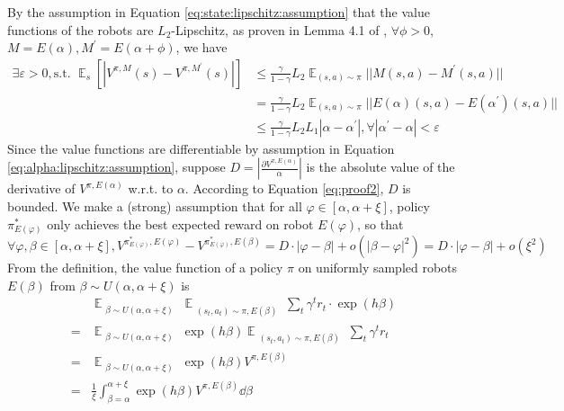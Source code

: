 By the assumption in Equation \eqref{eq:state:lipschitz:assumption} that the value functions of the robots are $L_2$-Lipschitz, as proven in Lemma 4.1 of \cite{slbo}, $\forall \phi > 0$, $M=E(\alpha), M^\prime=E(\alpha+\phi)$, we have 
\begin{equation}\label{eq:proof2}
\begin{split}
\exists \varepsilon > 0, \text{s.t. }
\mathop{\mathbb{E}}_{s} [ |V^{\pi,M}(s) - V^{\pi,M^\prime}(s)| ] 
& \le \frac{\gamma}{1-\gamma} L_2 \mathop{\mathbb{E}}_{(s,a)\sim \pi} || M(s,a) - M^\prime(s,a) || \\
& = \frac{\gamma}{1-\gamma} L_2 \mathop{\mathbb{E}}_{(s,a)\sim \pi} || E(\alpha)(s,a) - E(\alpha^\prime)(s,a) || \\
& \le \frac{\gamma}{1-\gamma} L_2 L_1 |\alpha - \alpha^\prime|, \forall |\alpha^\prime - \alpha | < \varepsilon 
\end{split}
\end{equation}
Since the value functions are differentiable by assumption in Equation \eqref{eq:alpha:lipschitz:assumption}, suppose $D = | \frac{\partial{V^{\pi,E(\alpha)}}}{\alpha} | $ is the absolute value of the derivative of $V^{\pi,E(\alpha)}$ w.r.t. to $\alpha$. 
According to Equation \eqref{eq:proof2}, $D$ is bounded.
We make a (strong) assumption that for all $\varphi\in [\alpha, \alpha+\xi]$, policy $\pi^*_{E(\varphi)}$ only achieves the best expected reward on robot $E(\varphi)$, so that
\begin{equation}
    \forall \varphi, \beta \in [\alpha, \alpha+\xi], 
    V^{\pi^*_{E(\varphi)},E(\varphi)} -
    V^{\pi^*_{E(\varphi)},E(\beta)} = D \cdot |\varphi - \beta| + o(|\beta-\varphi|^2)
    = D \cdot |\varphi - \beta| + o(\xi^2)
\end{equation}
From the definition, the value function of a policy $\pi$ on uniformly sampled robots $E(\beta)$ from $\beta\sim U(\alpha, \alpha+\xi)$ is
\begin{equation}
\begin{split}\label{eq:proof1}
    & \mathop{\mathbb{E}}_{ 
    \substack{
    \beta \sim U(\alpha, \alpha+\xi)
    }}
    \mathop{\mathbb{E}}_{ 
    \substack{(s_t, a_t) \sim \pi, E(\beta)
    }}
    \sum_{t} \gamma^t r_t \cdot\exp(h\beta) \\
    = & \mathop{\mathbb{E}}_{ 
    \substack{
    \beta \sim U(\alpha, \alpha+\xi)
    }}
    \exp(h\beta)
    \mathop{\mathbb{E}}_{ 
    \substack{(s_t, a_t) \sim \pi, E(\beta)
    }}
    \sum_{t} \gamma^t r_t  \\ 
    = & \mathop{\mathbb{E}}_{ 
    \substack{
    \beta \sim U(\alpha, \alpha+\xi)
    }}
    \exp(h\beta)
    V^{\pi,E(\beta)}  \\
    = & \frac{1}{\xi} \int_{\beta=\alpha}^{\alpha+\xi} \exp(h\beta)
    V^{\pi,E(\beta)} \dd{\beta}
\end{split}
\end{equation}
